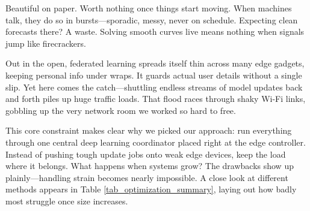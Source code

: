 \documentclass[a4paper,fleqn]{cas-dc}
\numberwithin{equation}{section}
\begin{document}
Beautiful on paper. Worth nothing once things start moving. When machines talk, they do so in bursts—sporadic, messy, never on schedule. Expecting clean forecasts there? A waste. Solving smooth curves live means nothing when signals jump like firecrackers.

Out in the open, federated learning spreads itself thin across many edge gadgets, keeping personal info under wraps. It guards actual user details without a single slip. Yet here comes the catch—shuttling endless streams of model updates back and forth piles up huge traffic loads. That flood races through shaky Wi-Fi links, gobbling up the very network room we worked so hard to free.

This core constraint makes clear why we picked our approach: run everything through one central deep learning coordinator placed right at the edge controller. Instead of pushing tough update jobs onto weak edge devices, keep the load where it belongs. What happens when systems grow? The drawbacks show up plainly—handling strain becomes nearly impossible. A close look at different methods appears in Table \ref{tab_optimization_summary}, laying out how badly most struggle once size increases.

\begin{table}[htbp]
\caption{Extended Comparative Analysis of Network Optimization Techniques}
\label{tab_optimization_summary}
\centering
{}
\end{table}
\end{document}
